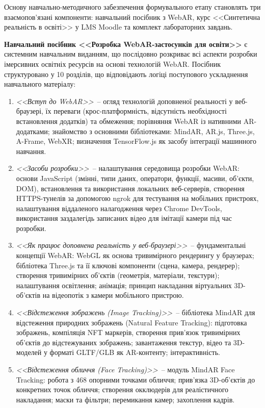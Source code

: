 Основу навчально-методичного забезпечення формувального етапу становлять три взаємопов'язані компоненти: навчальний посібник з WebAR, курс <<Синтетична реальність в освіті>> у LMS Moodle та комплект лабораторних завдань.

\textbf{Навчальний посібник <<Розробка WebAR-застосунків для освіти>>} є системним навчальним виданням, що послідовно розкриває всі аспекти розробки імерсивних освітніх ресурсів на основі технологій WebAR. Посібник структуровано у 10 розділів, що відповідають логіці поступового ускладнення навчального матеріалу:

\begin{enumerate}[label=\arabic*.]
\item \textit{<<Вступ до WebAR>>}~-- огляд технологій доповненої реальності у веб-браузері, їх переваги (крос-платформність, відсутність необхідності встановлення додатків) та обмеження; порівняння WebAR із нативними AR-додатками; знайомство з основними бібліотеками: MindAR, AR.js, Three.js, A-Frame, WebXR; визначення TensorFlow.js як засобу інтеграції машинного навчання.

\item \textit{<<Засоби розробки>>}~-- налаштування середовища розробки WebAR: основи JavaScript (змінні, типи даних, оператори, функції, масиви, об'єкти, DOM), встановлення та використання локальних веб-серверів, створення HTTPS-тунелів за допомогою ngrok для тестування на мобільних пристроях, налаштування віддаленого налагодження через Chrome DevTools, використання заздалегідь записаних відео для імітації камери під час розробки.

\item \textit{<<Як працює доповнена реальність у веб-браузері>>}~-- фундаментальні концепції WebAR: WebGL як основа тривимірного рендерингу у браузерах; бібліотека Three.js та її ключові компоненти (сцена, камера, рендерер); створення тривимірних об'єктів (геометрія, матеріали, текстури); налаштування освітлення; анімація; принцип накладання віртуальних 3D-об'єктів на відеопотік з камери мобільного пристрою.

\item \textit{<<Відстеження зображень (Image Tracking)>>}~-- бібліотека MindAR для відстеження природних зображень (Natural Feature Tracking): підготовка зображень, компіляція NFT маркерів, створення прив'язок тривимірних об'єктів до відстежуваних зображень; завантаження текстур, відео та 3D-моделей у форматі GLTF/GLB як AR-контенту; інтерактивність.

\item \textit{<<Відстеження обличчя (Face Tracking)>>}~-- модуль MindAR Face Tracking: робота з 468 опорними точками обличчя; прив'язка 3D-об'єктів до конкретних точок обличчя; створення окклюдерів для реалістичного накладання; маски та фільтри; перемикання камер; захоплення кадрів.


\end{enumerate}
